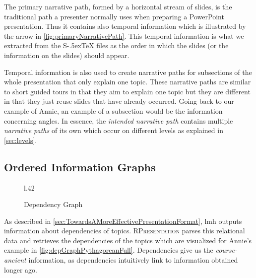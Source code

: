 \documentclass{llncs}
\def\stex{\texorpdfstring{\raisebox{-.5ex}S\kern-.5ex\TeX}{sTeX}\xspace}
\newcommand{\sys}{\textsc{RPresentation}\xspace}
\begin{document}
The primary narrative path, formed by a horizontal stream of slides, is the traditional
path a presenter normally uses when preparing a PowerPoint presentation. Thus it contains
also temporal information which is illustrated by the arrow in
\autoref{fig:primaryNarrativePath}. This temporal information is what we extracted from
the \stex files as the order in which the slides (or the information on the slides) should
appear.

Temporal information is also used to create narrative paths for subsections of the whole presentation that only explain one topic. These narrative paths are similar to short guided tours in that they aim to explain one topic but they are different in that they just reuse slides that have already occurred. Going back to our example of Annie, an example of a subsection would be the information concerning angles. In essence, the \textit{intended narrative path} contains multiple \textit{narrative paths} of its own which occur on different levels as explained in \autoref{sec:levels}.

\subsection{Ordered Information Graphs}
\label{sec:orderedInfoGraphs}

\begin{figure}l{.42\textwidth}\vspace{-2em}
  \vspace{-1.9em}
  \caption{Dependency Graph}\label{fig:depGraphPythagoreanFull}
  \vspace{-2em}
\end{figure}
As described in \autoref{sec:TowardsAMoreEffectivePresentationFormat}, lmh outputs information about dependencies of topics. \sys parses this relational data and retrieves the dependencies of the topics which are visualized for Annie's example in \autoref{fig:depGraphPythagoreanFull}. Dependencies give us the \textit{course-ancient} information, as dependencies intuitively link to information obtained longer ago.
\end{document}
